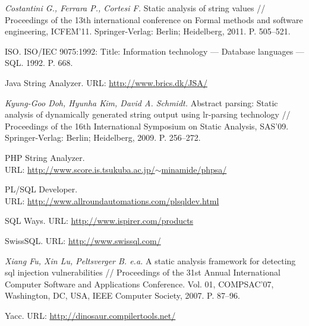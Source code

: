 \documentclass[a5paper]{article}
\begin{document}
\begin{thebibliography}{99}
\emph{Costantini G., Ferrara P., Cortesi F.} Static analysis of string values // Proceedings of the 13th international conference on Formal methods and software engineering, ICFEM’11. Springer-Verlag: Berlin; Heidelberg, 2011. P. 505--521.

ISO. ISO/IEC 9075:1992: Title: Information technology --- Database languages --- SQL. 1992. P. 668.

Java String Analyzer. URL: \href{http://www.brics.dk/JSA/}{http://www.brics.dk/JSA/}

\emph{Kyung-Goo Doh, Hyunha Kim, David A. Schmidt.} Abstract parsing: Static analysis of dynamically generated string output using lr-parsing technology // Proceedings of the 16th International Symposium on Static Analysis, SAS’09. Springer-Verlag: Berlin; Heidelberg, 2009. P. 256--272.

PHP String Analyzer. \\ URL: \href{http://www.score.is.tsukuba.ac.jp/~minamide/phpsa/}{http://www.score.is.tsukuba.ac.jp/$\sim$minamide/phpsa/}

PL/SQL Developer. \\ URL: \href{http://www.allroundautomations.com/plsqldev.html}{http://www.allroundautomations.com/plsqldev.html}

SQL Ways. URL: \href{http://www.ispirer.com/products}{http://www.ispirer.com/products}

SwissSQL. URL: \href{http://www.swissql.com/}{http://www.swissql.com/}

\emph{Xiang Fu, Xin Lu, Peltsverger B. e.a.} A static analysis framework for detecting sql injection vulnerabilities // Proceedings of the 31st Annual International Computer Software and Applications Conference. Vol. 01, COMPSAC’07, Washington, DC, USA, IEEE Computer Society, 2007. P. 87--96.

Yacc. URL: \href{http://dinosaur.compilertools.net/}{http://dinosaur.compilertools.net/}

\end{thebibliography}
\end{document}

